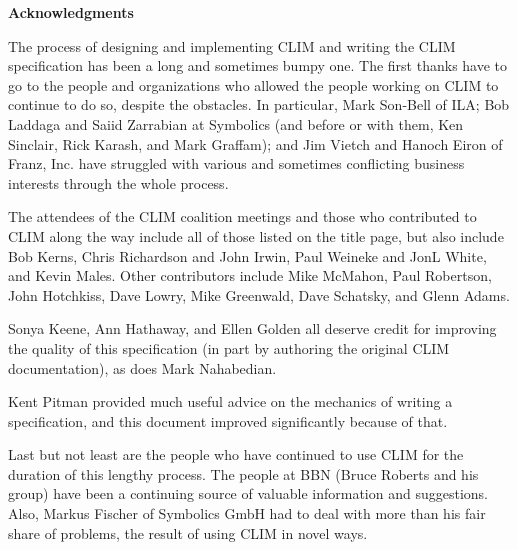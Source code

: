 
\vspace*{50pt}
{\huge\bf Acknowledgments}\par
\vskip 40pt

The process of designing and implementing CLIM and writing the CLIM
specification has been a long and sometimes bumpy one.  The first thanks have
to go to the people and organizations who allowed the people working on CLIM
to continue to do so, despite the obstacles.  In particular, Mark Son-Bell of
ILA; Bob Laddaga and Saiid Zarrabian at Symbolics (and before or with them,
Ken Sinclair, Rick Karash, and Mark Graffam); and Jim Vietch and Hanoch Eiron
of Franz, Inc.  have struggled with various and sometimes conflicting business
interests through the whole process.

The attendees of the CLIM coalition meetings and those who contributed to CLIM
along the way include all of those listed on the title page, but also include
Bob Kerns, Chris Richardson and John Irwin, Paul Weineke and JonL White, and
Kevin Males.  Other contributors include Mike McMahon, Paul Robertson, John
Hotchkiss, Dave Lowry, Mike Greenwald, Dave Schatsky, and Glenn Adams.

Sonya Keene, Ann Hathaway, and Ellen Golden all deserve credit for improving
the quality of this specification (in part by authoring the original CLIM
documentation), as does Mark Nahabedian.

Kent Pitman provided much useful advice on the mechanics of writing a
specification, and this document improved significantly because of that.

Last but not least are the people who have continued to use CLIM for the
duration of this lengthy process.  The people at BBN (Bruce Roberts and his
group) have been a continuing source of valuable information and suggestions.
Also, Markus Fischer of Symbolics GmbH had to deal with more than his fair
share of problems, the result of using CLIM in novel ways.
